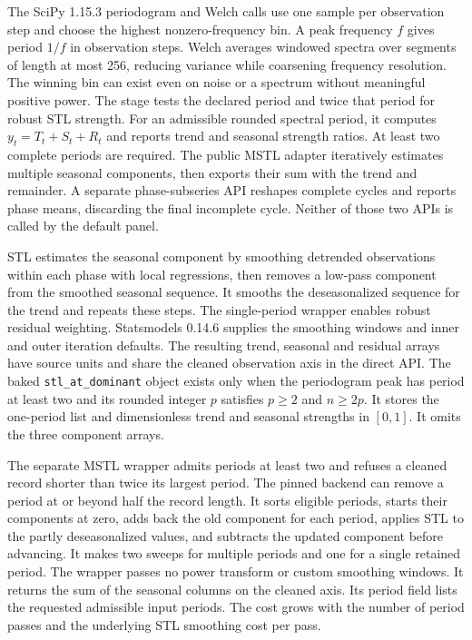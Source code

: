 The SciPy 1.15.3 periodogram and Welch calls use one sample per observation step and choose the highest nonzero-frequency bin. A peak frequency $f$ gives period $1/f$ in observation steps. Welch averages windowed spectra over segments of length at most 256, reducing variance while coarsening frequency resolution. The winning bin can exist even on noise or a spectrum without meaningful positive power. The stage tests the declared period and twice that period for robust STL strength. For an admissible rounded spectral period, it computes $y_t=T_t+S_t+R_t$ and reports trend and seasonal strength ratios. At least two complete periods are required. The public MSTL adapter iteratively estimates multiple seasonal components, then exports their sum with the trend and remainder. A separate phase-subseries API reshapes complete cycles and reports phase means, discarding the final incomplete cycle. Neither of those two APIs is called by the default panel.

STL estimates the seasonal component by smoothing detrended observations
within each phase with local regressions, then removes a low-pass
component from the smoothed seasonal sequence. It smooths the
deseasonalized sequence for the trend and repeats these steps. The
single-period wrapper enables robust residual weighting. Statsmodels
0.14.6 supplies the smoothing windows and inner and outer iteration
defaults. The resulting trend, seasonal and residual arrays have source
units and share the cleaned observation axis in the direct API. The baked
\texttt{stl\_at\_dominant} object exists only when the periodogram peak
has period at least two and its rounded integer $p$ satisfies $p\ge2$
and $n\ge2p$. It stores the one-period list and dimensionless trend and
seasonal strengths in $[0,1]$. It omits the three component arrays.

The separate MSTL wrapper admits periods at least two and refuses a
cleaned record shorter than twice its largest period. The pinned
backend can remove a period at or beyond half the record length.
It sorts eligible periods, starts their components at zero, adds back
the old component for each period, applies STL to the partly
deseasonalized values, and subtracts the updated component before
advancing. It makes two sweeps for multiple periods and one for a
single retained period. The wrapper passes no power transform or custom
smoothing windows. It returns the sum of the seasonal columns on the
cleaned axis. Its period field lists the requested admissible input
periods. The cost grows with the number of period passes and the
underlying STL smoothing cost per pass.

